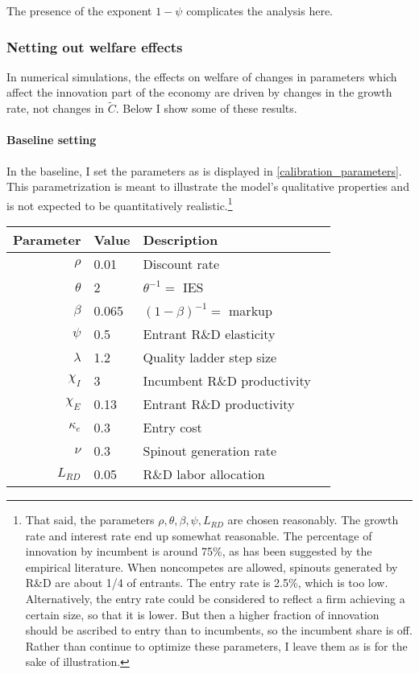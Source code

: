 \documentclass[12pt,english]{article}
\theoremstyle{remark}
\begin{document}
The presence of the exponent $1-\psi$ complicates the analysis here. 

\subsubsection{Netting out welfare effects}

In numerical simulations, the effects on welfare of changes in parameters which affect the innovation part of the economy are driven by changes in the growth rate, not changes in $\tilde{C}$. Below I show some of these results.

\paragraph{Baseline setting} In the baseline, I set the parameters as is displayed in \autoref{calibration_parameters}. This parametrization is meant to illustrate the model's qualitative properties and is not expected to be quantitatively realistic.\footnote{That said, the parameters $\rho, \theta, \beta, \psi, L_{RD}$ are chosen reasonably. The growth rate and interest rate end up somewhat reasonable. The percentage of innovation by incumbent is around 75\%, as has been suggested by the empirical literature. When noncompetes are allowed, spinouts generated by R\&D are about 1/4 of entrants. The entry rate is 2.5\%, which is too low. Alternatively, the entry rate could be considered to reflect a firm achieving a certain size, so that it is lower. But then a higher fraction of innovation should be ascribed to entry than to incumbents, so the incumbent share is off. Rather than continue to optimize these parameters, I leave them as is for the sake of illustration.}

\begin{table}[!htb]
	\centering
	\label{calibration_parameters}
	\begin{tabular}{rlll}
		\toprule \toprule
		Parameter & Value & Description \tabularnewline
		\midrule
		$\rho$ & 0.01 & Discount rate \tabularnewline
		$\theta$ & 2 & $\theta^{-1} = $ IES
		\tabularnewline
		$\beta$ & 0.065 & $(1-\beta)^{-1} = $ markup\tabularnewline
		$\psi$ & 0.5 & Entrant R\&D elasticity \tabularnewline
		$\lambda$ & 1.2 & Quality ladder step size
		\tabularnewline
		$\chi_I$ & 3 & Incumbent R\&D productivity
		\tabularnewline
		$\chi_E$ & 0.13 & Entrant R\&D productivity \tabularnewline
		$\kappa_e$ & 0.3 & Entry cost \tabularnewline
		$\nu$ & 0.3 & Spinout generation rate \tabularnewline
		$L_{RD}$ & 0.05 & R\&D labor allocation \tabularnewline
		\bottomrule
	\end{tabular}
\end{table}
\end{document}
